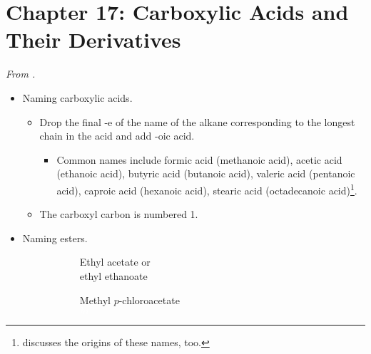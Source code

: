 \documentclass[../notes.tex]{subfiles}
\begin{document}
\section{Chapter 17: Carboxylic Acids and Their Derivatives}
\emph{From \textcite{bib:SolomonsEtAl}.}
\begin{itemize}
    \item Naming carboxylic acids.
    \begin{itemize}
        \item Drop the final -e of the name of the alkane corresponding to the longest chain in the acid and add -oic acid.
        \begin{itemize}
            \item Common names include formic acid (methanoic acid), acetic acid (ethanoic acid), butyric acid (butanoic acid), valeric acid (pentanoic acid), caproic acid (hexanoic acid), stearic acid (octadecanoic acid)\footnote{\textcite{bib:SolomonsEtAl} discusses the origins of these names, too.}.
        \end{itemize}
        \item The carboxyl carbon is numbered 1.
    \end{itemize}
    \item Naming esters.
    \begin{figure}[H]
        \centering
        \footnotesize
        \captionsetup{justification=centering}
        \begin{subfigure}[b]{0.3\linewidth}
            \centering
            \color{blx}
            \caption*{\textcolor{rex}{Ethyl} \textcolor{blx}{acetate} or\\\textcolor{rex}{ethyl} \textcolor{blx}{ethanoate}}
            \label{fig:esterNomenclaturea}
        \end{subfigure}
        \begin{subfigure}[b]{0.3\linewidth}
            \centering
            \color{blx}
            \caption*{\textcolor{rex}{Methyl} \textcolor{grx}{$p$-chloro}\textcolor{blx}{acetate}\\${\color{white}hi}$}
            \label{fig:esterNomenclatureb}
        \end{subfigure}
        \begin{subfigure}[b]{0.3\linewidth}
            \centering
            \color{blx}

\end{subfigure}
\end{figure}
\end{itemize}
\end{document}

